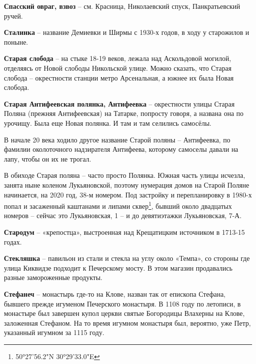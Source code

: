 \textbf{Спасский овраг, взвоз} – см. Красница, Николаевский спуск, Панкратьевский ручей.\\

\medskip

\textbf{Сталинка} – название Демиевки и Ширмы с 1930-х годов, в ходу у старожилов и поныне.\\

\medskip


\textbf{Старая слобода} – на стыке 18-19 веков, лежала над Аскольдовой могилой, отделяясь от Новой слободы Никольской улице. Можно сказать, что Старая слобода – окрестности станции метро Арсенальная, а южнее их была Новая слобода.\\

\medskip

\textbf{Старая Антифеевская полянка, Антифеевка} – окрестности улицы Старая Поляна (прежняя Антифеевская) на Татарке, попросту говоря, а названа она по урочищу. Была еще Новая полянка. И там и там селились самосёлы. 

В начале 20 века ходило другое название Старой поляны – Антифеевка, по фамилии околоточного надзирателя Антифеева, которому самоселы давали на лапу, чтобы он их не трогал. 

В обиходе Старая поляна – часто просто Полянка. Южная часть улицы исчезла, занята ныне коленом Лукьяновской, поэтому нумерация домов на Старой Поляне начинается, на 2020 год, 38-м номером. Под застройку и перепланировку в 1980-х попал и засаженный каштанами и липами сквер\footnote{50°27'56.2"N 30°29'33.0"E}, бывший около двадцатых номеров – сейчас это Лукьяновская, 1 – и до девятиэтажки Лукьяновская, 7-А.\\

\medskip

\textbf{Стародум} – «крепостца», выстроенная  над Крещатицким источником в 1713-15 годах.\\

\medskip

\textbf{Стекляшка} – павильон из стали и стекла на углу около «Темпа», со стороны где улица Киквидзе подходит к Печерскому мосту. В этом магазин продавались разные замороженные продукты.\\

\medskip

\textbf{Стефанеч} – монастырь где-то на Клове, назван так от епископа Стефана, бывшего прежде игуменом Печерского монастыря. В 1108 году по летописи, в монастыре был завершен купол церкви святые Богородицы Влахерны на Клове, заложенная Стефаном. На то время игумном монастыря был, вероятно, уже Петр, указанный игумном за 1115 году.\\

